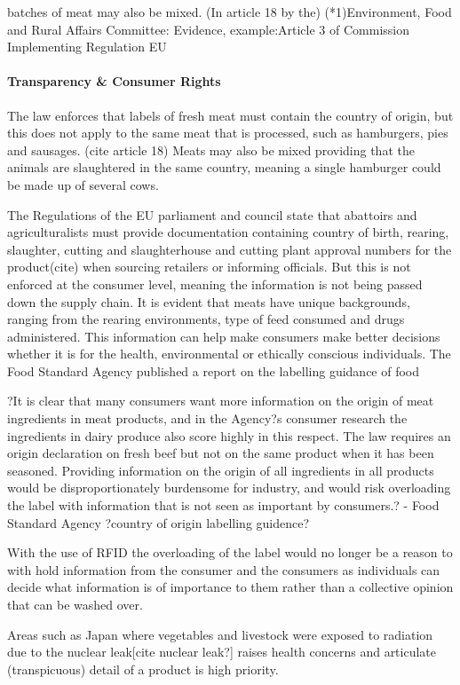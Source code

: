 \documentclass[a4paper, 11pt]{article}
\begin{document}
batches of meat may also be mixed. (In article 18 by the)
(*1)Environment, Food and Rural Affairs Committee: Evidence,
example:Article 3 of Commission Implementing Regulation EU

\paragraph{Transparency \& Consumer Rights}
The law enforces that labels of fresh meat must contain the country of origin, but this does not apply to the same meat that is processed, such as hamburgers, pies and sausages. (cite article 18) Meats may also be mixed providing that the animals are slaughtered in the same country, meaning a single hamburger could be made up of several cows. 

The Regulations of the EU parliament and council state that abattoirs and agriculturalists must provide documentation containing country of birth, rearing, slaughter, cutting and slaughterhouse and cutting plant approval numbers for the product(cite) when sourcing retailers or informing officials. But this is not enforced at the consumer level, meaning the information is not being passed down the supply chain. It is evident that meats have unique backgrounds, ranging from the rearing environments, type of feed consumed and drugs administered. This information can help make consumers make better decisions whether it is for the health, environmental or ethically conscious individuals. The Food Standard Agency published a report on the labelling guidance of food 

?It is clear that many consumers want more information on the origin of meat ingredients in meat products, and in the Agency?s consumer research the ingredients in dairy produce also score highly in this respect. The law requires an origin declaration on fresh beef but not on the same product when it has been seasoned. Providing information on the origin of all ingredients in all products would be disproportionately burdensome for industry, and would risk overloading the label with information that is not
seen as important by consumers.? - Food Standard Agency ?country of origin labelling guidence?

With the use of RFID the overloading of the label would no longer be a reason to with hold information from the consumer and the consumers as individuals can decide what information is of importance to them rather than a collective opinion that can be washed over.

Areas such as Japan where vegetables and livestock were exposed to radiation due to the nuclear leak[cite nuclear leak?] raises health concerns and articulate (transpicuous) detail of a product is high priority.
\end{document}
